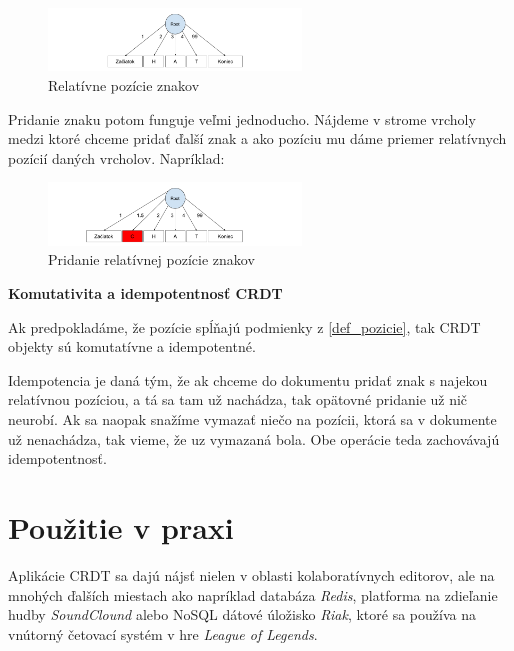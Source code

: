 \begin{figure}[H]
\centerline{\includegraphics[width=0.6\textwidth]{images/relativne_pozicie1}}
\caption[Relatívne pozície znakov]{Relatívne pozície znakov}
\label{obr:relativne}
\end{figure}

Pridanie znaku potom funguje veľmi jednoducho. Nájdeme v strome vrcholy medzi ktoré
chceme pridať ďalší znak a ako pozíciu mu dáme priemer relatívnych pozícií daných
vrcholov. Napríklad:
\begin{figure}[H]
\centerline{\includegraphics[width=0.6\textwidth]{images/relativne_pozicie2}}
\caption[Pridanie relatívnej pozície znakov]{Pridanie relatívnej pozície znakov}
\label{obr:relativne_pridanie}
\end{figure}

\begin{flushleft}\textbf {Komutativita a idempotentnosť CRDT}\end{flushleft}
Ak predpokladáme, že pozície spĺňajú podmienky z \ref{def_pozicie}, tak CRDT objekty sú
komutatívne a idempotentné.

Idempotencia je daná tým, že ak chceme do dokumentu pridať znak s najekou relatívnou pozíciou, a tá
sa tam už nachádza, tak opätovné pridanie už nič neurobí. Ak sa naopak snažíme vymazať niečo na
pozícii, ktorá sa v dokumente už nenachádza, tak vieme, že uz vymazaná bola. Obe operácie teda
zachovávajú idempotentnosť.
\cite{nuno_preguica}

\section{Použitie v praxi}
Aplikácie CRDT sa dajú nájsť nielen v oblasti kolaboratívnych editorov, ale na mnohých ďalších
miestach ako napríklad databáza \textit{Redis}, platforma na zdieľanie hudby \textit{SoundClound}
alebo NoSQL 
dátové úložisko \textit{Riak}, ktoré sa používa na vnútorný četovací systém v hre 
\textit{League of Legends}.
\cite{crdt_wiki}

